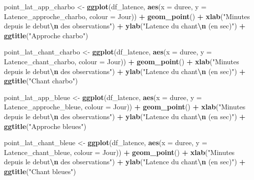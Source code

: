 \documentclass[
  french,
]{article}
\newenvironment{Shaded}{\begin{snugshade}}{\end{snugshade}}
\newcommand{\AttributeTok}[1]{\textcolor[rgb]{0.13,0.29,0.53}{#1}}
\newcommand{\FunctionTok}[1]{\textcolor[rgb]{0.13,0.29,0.53}{\textbf{#1}}}
\newcommand{\NormalTok}[1]{#1}
\newcommand{\OtherTok}[1]{\textcolor[rgb]{0.56,0.35,0.01}{#1}}
\newcommand{\SpecialCharTok}[1]{\textcolor[rgb]{0.81,0.36,0.00}{\textbf{#1}}}
\newcommand{\StringTok}[1]{\textcolor[rgb]{0.31,0.60,0.02}{#1}}
\begin{document}
\begin{Shaded}
\begin{Highlighting}[]
\NormalTok{point\_lat\_app\_charbo }\OtherTok{\textless{}{-}} \FunctionTok{ggplot}\NormalTok{(df\_latence, }\FunctionTok{aes}\NormalTok{(}\AttributeTok{x =}\NormalTok{ duree, }\AttributeTok{y =}\NormalTok{ Latence\_approche\_charbo, }\AttributeTok{colour =}\NormalTok{ Jour)) }\SpecialCharTok{+}
  \FunctionTok{geom\_point}\NormalTok{() }\SpecialCharTok{+}
  \FunctionTok{xlab}\NormalTok{(}\StringTok{"Minutes depuis le debut}\SpecialCharTok{\textbackslash{}n}\StringTok{ des observations"}\NormalTok{) }\SpecialCharTok{+}
  \FunctionTok{ylab}\NormalTok{(}\StringTok{"Latence du chant}\SpecialCharTok{\textbackslash{}n}\StringTok{  (en sec)"}\NormalTok{) }\SpecialCharTok{+}
  \FunctionTok{ggtitle}\NormalTok{(}\StringTok{"Approche charbo"}\NormalTok{)}

\NormalTok{point\_lat\_chant\_charbo }\OtherTok{\textless{}{-}} \FunctionTok{ggplot}\NormalTok{(df\_latence, }\FunctionTok{aes}\NormalTok{(}\AttributeTok{x =}\NormalTok{ duree, }\AttributeTok{y =}\NormalTok{ Latence\_chant\_charbo, }\AttributeTok{colour =}\NormalTok{ Jour)) }\SpecialCharTok{+}
  \FunctionTok{geom\_point}\NormalTok{() }\SpecialCharTok{+}
  \FunctionTok{xlab}\NormalTok{(}\StringTok{"Minutes depuis le debut}\SpecialCharTok{\textbackslash{}n}\StringTok{ des observations"}\NormalTok{) }\SpecialCharTok{+}
  \FunctionTok{ylab}\NormalTok{(}\StringTok{"Latence du chant}\SpecialCharTok{\textbackslash{}n}\StringTok{  (en sec)"}\NormalTok{) }\SpecialCharTok{+}
  \FunctionTok{ggtitle}\NormalTok{(}\StringTok{"Chant charbo"}\NormalTok{)}

\NormalTok{point\_lat\_app\_bleue }\OtherTok{\textless{}{-}} \FunctionTok{ggplot}\NormalTok{(df\_latence, }\FunctionTok{aes}\NormalTok{(}\AttributeTok{x =}\NormalTok{ duree, }\AttributeTok{y =}\NormalTok{ Latence\_approche\_bleue, }\AttributeTok{colour =}\NormalTok{ Jour)) }\SpecialCharTok{+}
  \FunctionTok{geom\_point}\NormalTok{() }\SpecialCharTok{+}
  \FunctionTok{xlab}\NormalTok{(}\StringTok{"Minutes depuis le debut}\SpecialCharTok{\textbackslash{}n}\StringTok{ des observations"}\NormalTok{) }\SpecialCharTok{+}
  \FunctionTok{ylab}\NormalTok{(}\StringTok{"Latence du chant}\SpecialCharTok{\textbackslash{}n}\StringTok{  (en sec)"}\NormalTok{) }\SpecialCharTok{+}
  \FunctionTok{ggtitle}\NormalTok{(}\StringTok{"Approche bleues"}\NormalTok{)}

\NormalTok{point\_lat\_chant\_bleue }\OtherTok{\textless{}{-}} \FunctionTok{ggplot}\NormalTok{(df\_latence, }\FunctionTok{aes}\NormalTok{(}\AttributeTok{x =}\NormalTok{ duree, }\AttributeTok{y =}\NormalTok{ Latence\_chant\_bleue, }\AttributeTok{colour =}\NormalTok{ Jour)) }\SpecialCharTok{+}
  \FunctionTok{geom\_point}\NormalTok{() }\SpecialCharTok{+}
  \FunctionTok{xlab}\NormalTok{(}\StringTok{"Minutes depuis le debut}\SpecialCharTok{\textbackslash{}n}\StringTok{ des observations"}\NormalTok{) }\SpecialCharTok{+}
  \FunctionTok{ylab}\NormalTok{(}\StringTok{"Latence du chant}\SpecialCharTok{\textbackslash{}n}\StringTok{  (en sec)"}\NormalTok{) }\SpecialCharTok{+}
  \FunctionTok{ggtitle}\NormalTok{(}\StringTok{"Chant bleues"}\NormalTok{)}


\end{Highlighting}
\end{Shaded}
\end{document}
